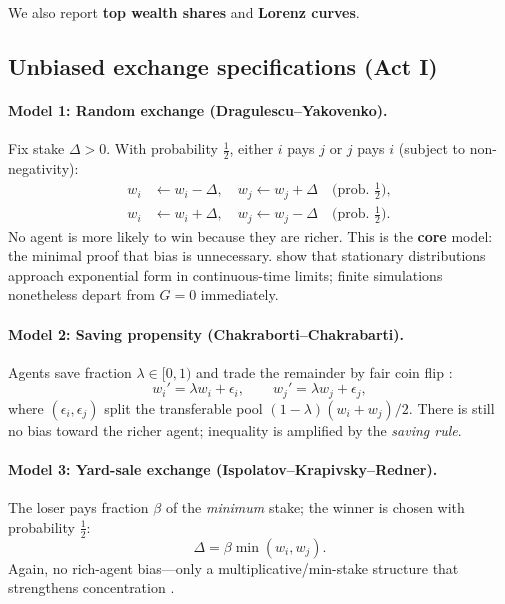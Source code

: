 \documentclass[12pt,a4paper]{article}
\begin{document}
We also report \textbf{top wealth shares} and \textbf{Lorenz curves}.

\subsection{Unbiased exchange specifications (Act I)}

\paragraph{Model 1: Random exchange (Dragulescu--Yakovenko).}
\label{model:dy}
Fix stake $\Delta > 0$.
With probability $\tfrac{1}{2}$, either $i$ pays $j$ or $j$ pays $i$ (subject to non-negativity):
\begin{align}
  w_i &\leftarrow w_i - \Delta, \quad w_j \leftarrow w_j + \Delta \quad \text{(prob.\ $\tfrac{1}{2}$)}, \label{eq:dy}\\
  w_i &\leftarrow w_i + \Delta, \quad w_j \leftarrow w_j - \Delta \quad \text{(prob.\ $\tfrac{1}{2}$)}. \nonumber
\end{align}
No agent is more likely to win because they are richer.
This is the \textbf{core} model: the minimal proof that bias is unnecessary.
\citet{dragulescu2000} show that stationary distributions approach exponential form in continuous-time limits; finite simulations nonetheless depart from $G=0$ immediately.

\paragraph{Model 2: Saving propensity (Chakraborti--Chakrabarti).}
Agents save fraction $\lambda \in [0,1)$ and trade the remainder by fair coin flip \citep{chakraborti2000, chatterjee2007}:
\begin{equation}
  w_i' = \lambda w_i + \epsilon_i, \qquad w_j' = \lambda w_j + \epsilon_j,
  \label{eq:chakraborti}
\end{equation}
where $(\epsilon_i,\epsilon_j)$ split the transferable pool $(1-\lambda)(w_i+w_j)/2$.
There is still no bias toward the richer agent; inequality is amplified by the \emph{saving rule}.

\paragraph{Model 3: Yard-sale exchange (Ispolatov--Krapivsky--Redner).}
The loser pays fraction $\beta$ of the \emph{minimum} stake; the winner is chosen with probability $\tfrac{1}{2}$:
\begin{equation}
  \Delta = \beta \min(w_i, w_j).
  \label{eq:yardsale}
\end{equation}
Again, no rich-agent bias---only a multiplicative/min-stake structure that strengthens concentration \citep{ispolatov1998, bouchaud2000}.
\end{document}
